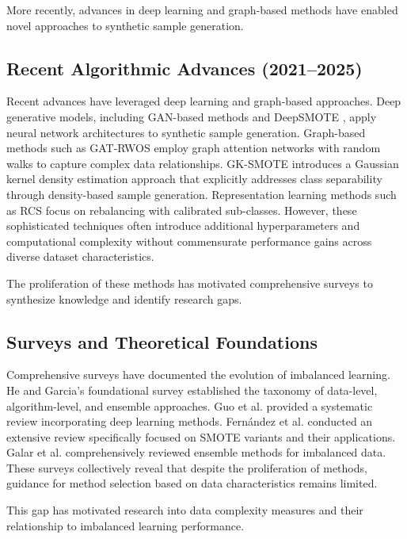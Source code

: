 \documentclass[12pt,a4paper]{article}
\theoremstyle{definition}
\begin{document}
More recently, advances in deep learning and graph-based methods have enabled novel approaches to synthetic sample generation.

\subsection{Recent Algorithmic Advances (2021--2025)}
\indent Recent advances have leveraged deep learning and graph-based approaches. Deep generative models, including GAN-based methods \cite{mullick2019gan,engelmann2021conditional} and DeepSMOTE \cite{dablain2021deepsmote}, apply neural network architectures to synthetic sample generation. Graph-based methods such as GAT-RWOS \cite{gat_rwos2024} employ graph attention networks with random walks to capture complex data relationships. GK-SMOTE \cite{gk_smote2025} introduces a Gaussian kernel density estimation approach that explicitly addresses class separability through density-based sample generation. Representation learning methods such as RCS \cite{rcs2025} focus on rebalancing with calibrated sub-classes. However, these sophisticated techniques often introduce additional hyperparameters and computational complexity without commensurate performance gains across diverse dataset characteristics.

The proliferation of these methods has motivated comprehensive surveys to synthesize knowledge and identify research gaps.

\subsection{Surveys and Theoretical Foundations}
\indent Comprehensive surveys have documented the evolution of imbalanced learning. He and Garcia's \cite{he2009learning} foundational survey established the taxonomy of data-level, algorithm-level, and ensemble approaches. Guo et al. \cite{guo2017learning} provided a systematic review incorporating deep learning methods. Fern{\'a}ndez et al. \cite{fernandez2018smote} conducted an extensive review specifically focused on SMOTE variants and their applications. Galar et al. \cite{galar2012review} comprehensively reviewed ensemble methods for imbalanced data. These surveys collectively reveal that despite the proliferation of methods, guidance for method selection based on data characteristics remains limited.

This gap has motivated research into data complexity measures and their relationship to imbalanced learning performance.
\end{document}
